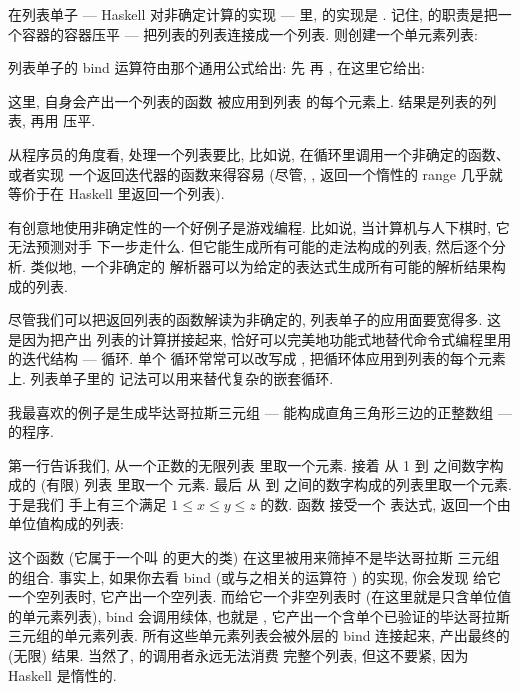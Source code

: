 在列表单子 --- Haskell 对非确定计算的实现 --- 里,  的实现是
. 记住,  的职责是把一个容器的容器压平 --- 
把列表的列表连接成一个列表.  则创建一个单元素列表:

列表单子的 bind 运算符由那个通用公式给出: 先  再 ,
在这里它给出:

这里, 自身会产出一个列表的函数  被应用到列表  的每个元素上.
结果是列表的列表, 再用  压平.

从程序员的角度看, 处理一个列表要比, 比如说, 在循环里调用一个非确定的函数、或者实现
一个返回迭代器的函数来得容易 (尽管,
,
返回一个惰性的 range 几乎就等价于在 Haskell 里返回一个列表).

有创意地使用非确定性的一个好例子是游戏编程. 比如说, 当计算机与人下棋时, 它无法预测对手
下一步走什么. 但它能生成所有可能的走法构成的列表, 然后逐个分析. 类似地, 一个非确定的
解析器可以为给定的表达式生成所有可能的解析结果构成的列表.

尽管我们可以把返回列表的函数解读为非确定的, 列表单子的应用面要宽得多. 这是因为把产出
列表的计算拼接起来, 恰好可以完美地功能式地替代命令式编程里用的迭代结构 --- 循环. 单个
循环常常可以改写成 , 把循环体应用到列表的每个元素上. 列表单子里的
 记法可以用来替代复杂的嵌套循环.

我最喜欢的例子是生成毕达哥拉斯三元组 --- 能构成直角三角形三边的正整数组 --- 的程序.

第一行告诉我们,  从一个正数的无限列表 \code{{[}1..{]}} 里取一个元素.
接着  从 1 到  之间数字构成的 (有限) 列表 \code{{[}1..z{]}} 里取一个
元素. 最后  从  到  之间的数字构成的列表里取一个元素. 于是我们
手上有三个满足 $1 \leqslant x \leqslant y \leqslant z$ 的数.
函数  接受一个  表达式, 返回一个由单位值构成的列表:

这个函数 (它属于一个叫  的更大的类) 在这里被用来筛掉不是毕达哥拉斯
三元组的组合. 事实上, 如果你去看 bind (或与之相关的运算符 \code{>>}) 的实现, 你会发现
给它一个空列表时, 它产出一个空列表. 而给它一个非空列表时 (在这里就是只含单位值
\code{{[}(){]}} 的单元素列表), bind 会调用续体, 也就是 ,
它产出一个含单个已验证的毕达哥拉斯三元组的单元素列表. 所有这些单元素列表会被外层的
bind 连接起来, 产出最终的 (无限) 结果. 当然了,  的调用者永远无法消费
完整个列表, 但这不要紧, 因为 Haskell 是惰性的.

